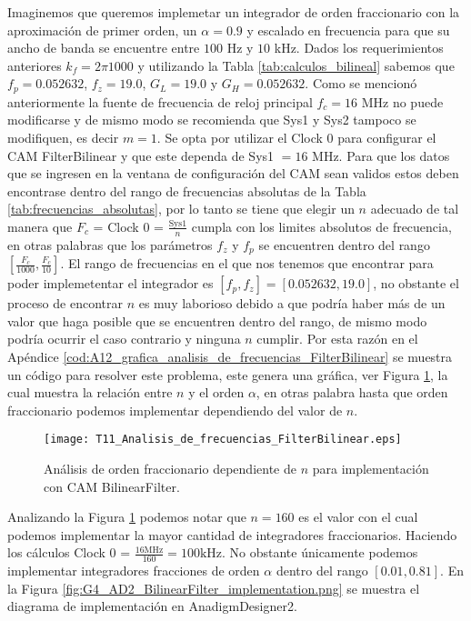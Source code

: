 Imaginemos que queremos implemetar un integrador de orden fraccionario con la aproximación de primer orden, un $\alpha = 0.9$ y escalado en frecuencia para que su ancho de banda se encuentre entre $100$ Hz y $10$ kHz. Dados los requerimientos anteriores $k_{f} = 2 \pi 1000$ y utilizando la Tabla \ref{tab:calculos_bilineal} sabemos que $f_{p} = 0.052632$, $f_{z} = 19.0$, $G_{L} = 19.0$ y $G_{H} = 0.052632$. Como se mencionó anteriormente la fuente de frecuencia de reloj principal $f_{c} = 16$ MHz no puede modificarse y de mismo modo se recomienda que Sys1 y Sys2 tampoco se modifiquen, es decir $m = 1$. Se opta por utilizar el Clock 0 para configurar el CAM FilterBilinear y que este dependa de Sys1 $=16$ MHz. Para que los datos que se ingresen en la ventana de configuración del CAM sean validos estos deben encontrase dentro del rango de frecuencias absolutas de la Tabla \ref{tab:frecuencias_absolutas}, por lo tanto se tiene que elegir un $n$ adecuado de tal manera que $F_{c}$ = Clock 0 = $\frac{\mathrm{Sys1}}{n}$ cumpla con los limites absolutos de frecuencia, en otras palabras que los parámetros $f_{z}$ y $f_{p}$ se encuentren dentro del rango $[\frac{F_{c}}{1000}, \frac{F_{c}}{10}]$. El rango de frecuencias en el que nos tenemos que encontrar para poder implemetentar el integrador es $[f_{p},f_{z}] = [0.052632, 19.0]$, no obstante el proceso de encontrar $n$ es muy laborioso debido a que podría haber más de un valor que haga posible que se encuentren dentro del rango, de mismo modo podría ocurrir el caso contrario y ninguna $n$ cumplir. Por esta razón en el Apéndice \ref{cod:A12_grafica_analisis_de_frecuencias_FilterBilinear} se muestra un código para resolver este problema, este genera una gráfica, ver Figura \ref{fig:T11_Analisis_de_frecuencias_FilterBilinear.eps}, la cual muestra la relación entre $n$ y el orden $\alpha$, en otras palabra hasta que orden fraccionario podemos implementar dependiendo del valor de $n$.

\begin{figure}[hbtp]
\caption{Análisis de orden fraccionario dependiente de $n$ para implementación con CAM BilinearFilter.} 
\label{fig:T11_Analisis_de_frecuencias_FilterBilinear.eps}
\centering
\texttt{[image: T11\_Analisis\_de\_frecuencias\_FilterBilinear.eps]}
\end{figure}

Analizando la Figura \ref{fig:T11_Analisis_de_frecuencias_FilterBilinear.eps} podemos notar que $n = 160$ es el valor con el cual podemos implementar la mayor cantidad de integradores fraccionarios. Haciendo los cálculos Clock 0 = $\frac{16 \mathrm{MHz}}{160} = 100 \mathrm{kHz}$. No obstante únicamente podemos implementar integradores fracciones de orden $\alpha$ dentro del rango $[0.01, 0.81]$. En la Figura \ref{fig:G4_AD2_BilinearFilter_implementation.png} se muestra el diagrama de implementación en AnadigmDesigner2.

